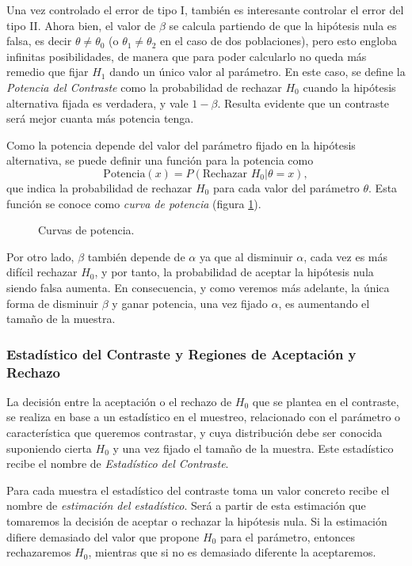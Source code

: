 Una vez controlado el error de tipo I, también es interesante controlar el error del tipo II.
Ahora bien, el valor de $\beta$ se calcula partiendo de que la hipótesis nula es falsa, es decir $\theta\neq \theta_0$
(o $\theta_1\neq \theta_2$ en el caso de dos poblaciones), pero esto engloba infinitas posibilidades, de manera que para
poder calcularlo no queda más remedio que fijar $H_1$ dando un único valor al parámetro.
En este caso, se define la \emph{Potencia del Contraste} como la probabilidad de rechazar $H_0$ cuando la hipótesis
alternativa fijada es verdadera, y vale $1-\beta$.
Resulta evidente que un contraste será mejor cuanta más potencia tenga.

Como la potencia depende del valor del parámetro fijado en la hipótesis alternativa, se puede definir una función para
la potencia como
\[ 
\textrm{Potencia} (x)=P(\textrm{Rechazar }H_0|\theta=x),
\]
que indica la probabilidad de rechazar $H_0$ para cada valor del parámetro $\theta$.
Esta función se conoce como \emph{curva de potencia} (figura \ref{g:curvas_potencia}).

\begin{figure}[h!]
\begin{center}
\scalebox{0.8}{}
\caption{Curvas de potencia.}\label{g:curvas_potencia}
\end{center}
\end{figure}

Por otro lado, $\beta$ también depende de $\alpha$ ya que al disminuir $\alpha$, cada vez es más difícil rechazar $H_0$,
y por tanto, la probabilidad de aceptar la hipótesis nula siendo falsa aumenta.
En consecuencia, y como veremos más adelante, la única forma de disminuir $\beta$ y ganar potencia, una vez fijado
$\alpha$, es aumentando el tamaño de la muestra.


\subsubsection{Estadístico del Contraste y Regiones de Aceptación y Rechazo}
La decisión entre la aceptación o el rechazo de $H_0$ que se plantea en el contraste, se realiza en base a un
estadístico en el muestreo, relacionado con el parámetro o característica que queremos contrastar, y cuya distribución
debe ser conocida suponiendo cierta $H_0$ y una vez fijado el tamaño de la muestra.
Este estadístico recibe el nombre de \emph{Estadístico del Contraste}.

Para cada muestra el estadístico del contraste toma un valor concreto recibe el nombre de \emph{estimación del
estadístico}.
Será a partir de esta estimación que tomaremos la decisión de aceptar o rechazar la hipótesis nula.
Si la estimación difiere demasiado del valor que propone $H_0$ para el parámetro, entonces rechazaremos $H_0$, mientras
que si no es demasiado diferente la aceptaremos.

